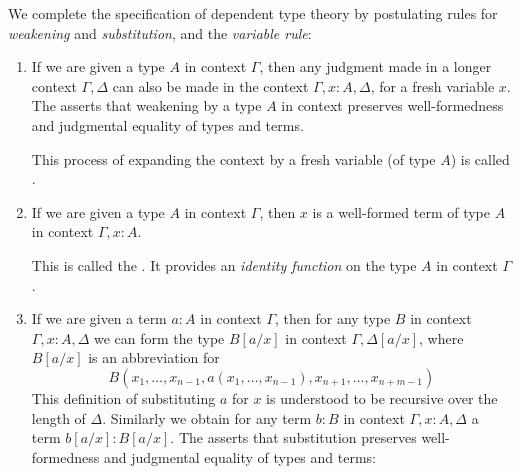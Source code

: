 We complete the specification of dependent type theory by postulating rules for \emph{weakening} and \emph{substitution}, and the \emph{variable rule}:
\begin{enumerate}
\item If we are given a type $A$ in context $\Gamma$, then any judgment made in a longer context $\Gamma,\Delta$ can also be made in the context $\Gamma,x:A,\Delta$, for a fresh variable $x$. The  asserts that weakening by a type $A$ in context preserves well-formedness and judgmental equality of types and terms.
\begin{prooftree}
\end{prooftree}
This process of expanding the context by a fresh variable (of type $A$) is called .
\item If we are given a type $A$ in context $\Gamma$, then $x$ is a well-formed term of type $A$ in context $\Gamma,x:A$.
\begin{prooftree}
\end{prooftree}
This is called the . It provides an \emph{identity function} on the type $A$ in context $\Gamma$.
\item If we are given a term $a:A$ in context $\Gamma$, then for any type $B$ in context $\Gamma,x:A,\Delta$ we can form the type $B[a/x]$ in context $\Gamma,\Delta[a/x]$, where $B[a/x]$ is an abbreviation for
\begin{equation*}
B(x_1,\ldots,x_{n-1},a(x_1,\ldots,x_{n-1}),x_{n+1},\ldots,x_{n+m-1})
\end{equation*}
This definition of substituting $a$ for $x$ is understood to be recursive over the length of $\Delta$. Similarly we obtain for any term $b:B$ in context $\Gamma,x:A,\Delta$ a term $b[a/x]:B[a/x]$. The  asserts that substitution preserves well-formedness and judgmental equality of types and terms:
\begin{prooftree}
\end{prooftree}

\end{enumerate}
